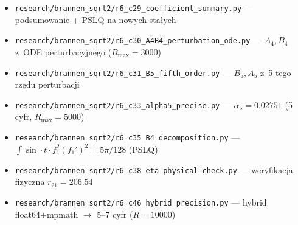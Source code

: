 \begin{itemize}
\item \texttt{research/brannen\_sqrt2/r6\_c29\_coefficient\_summary.py} --- podsumowanie + PSLQ na nowych sta\l{}ych
\item \texttt{research/brannen\_sqrt2/r6\_c30\_A4B4\_perturbation\_ode.py} --- $A_4, B_4$ z~ODE perturbacyjnego ($R_{\max}=3000$)
\item \texttt{research/brannen\_sqrt2/r6\_c31\_B5\_fifth\_order.py} --- $B_5, A_5$ z~5-tego rz\k{e}du perturbacji
\item \texttt{research/brannen\_sqrt2/r6\_c33\_alpha5\_precise.py} --- $\alpha_5 = 0.02751$ (5 cyfr, $R_{\max} = 5000$)
\item \texttt{research/brannen\_sqrt2/r6\_c35\_B4\_decomposition.py} --- $\int\!\sin\!\cdot\!t\!\cdot\!f_1^2(f_1')^2 = 5\pi/128$ (PSLQ)
\item \texttt{research/brannen\_sqrt2/r6\_c38\_eta\_physical\_check.py} --- weryfikacja fizyczna $r_{21} = 206.54$
\item \texttt{research/brannen\_sqrt2/r6\_c46\_hybrid\_precision.py} --- hybrid float64+mpmath $\to$ 5--7 cyfr ($R=10000$)
\end{itemize}
